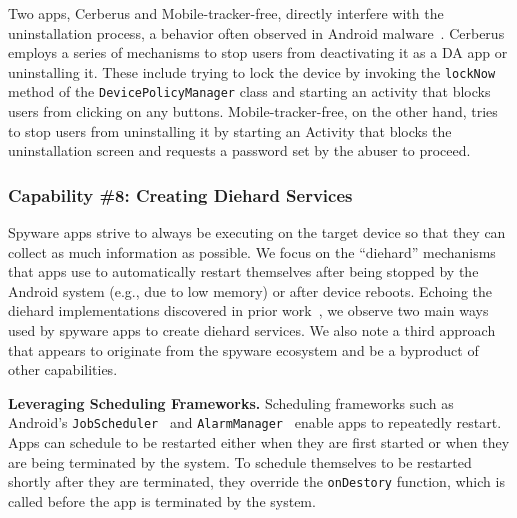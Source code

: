 Two apps, Cerberus and Mobile-tracker-free, directly interfere with the
uninstallation process, a behavior often observed in Android
malware~\cite{shan2019device,aljarrah2016maintaining}. Cerberus employs a series
of mechanisms to stop users from deactivating it as a DA app or
uninstalling it. These include trying to lock the device by invoking the
\texttt{lockNow} method of the \texttt{DevicePolicyManager} class and starting
an activity that blocks users from clicking on any buttons. Mobile-tracker-free,
on the other hand, tries to stop users from uninstalling it by starting an
Activity that blocks the uninstallation screen and requests a password set
by the abuser to proceed.

\subsubsection*{Capability \#8: Creating Diehard Services}
%
Spyware apps strive to always be executing on the target device so
that they can collect as much information as possible.  We focus on
the ``diehard'' mechanisms that apps use to automatically restart
themselves after being stopped by the Android system (e.g., due to low memory) or after device
reboots. Echoing the diehard implementations discovered in prior
work~\cite{shao2019lightweight,zhou2020demystifying}, we observe two
main ways used by spyware apps to create diehard services. We also note
a third approach that appears to originate from the spyware ecosystem
and be a byproduct of other capabilities.

\textbf{Leveraging Scheduling Frameworks.} Scheduling frameworks such as Android's
\texttt{JobScheduler}~\cite{JobSched94:online} and
\texttt{AlarmManager}~\cite{AlarmMan39:online} enable apps to repeatedly
restart. Apps can schedule to be restarted either when they are
first started or when they are being terminated by the system. To schedule
themselves to be restarted shortly after they are terminated, they override the
\texttt{onDestory} function, which is called before the app is terminated by the
system.

